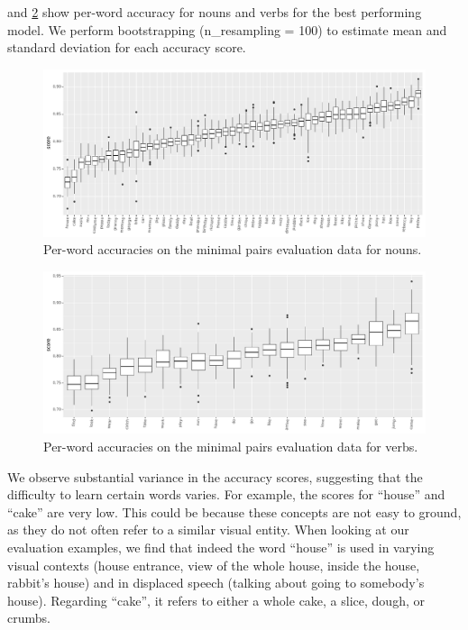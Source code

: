  and
\ref{fig:accuracy_targeted_triplets_verbs} show per-word
accuracy for nouns and verbs for the best performing model.
We perform bootstrapping (n\_resampling = 100) to estimate mean and standard 
deviation for each accuracy score.


\begin{figure}[htb]
  \centering
  \includegraphics[width=\textwidth]{results/targeted_triplets/results_per_word_version_335_NOUN.pdf}
  \caption{Per-word accuracies on the minimal pairs evaluation data for nouns.}
  \label{fig:accuracy_targeted_triplets_nouns}
\end{figure}

\begin{figure}[htb]
  \centering
  \includegraphics[width=\textwidth]{results/targeted_triplets/results_per_word_version_335_VERB.pdf}
  \caption{Per-word accuracies on the minimal pairs evaluation data
    for verbs.}
  \label{fig:accuracy_targeted_triplets_verbs}
\end{figure}

We observe substantial variance in the accuracy scores, suggesting that the 
difficulty to learn certain words varies. For example, the 
scores for ``house'' and ``cake'' are very low. This could be because these 
concepts are not easy to ground, as they do not often refer to a similar visual 
entity. When looking at our evaluation examples, we find that indeed the word 
``house'' is used in varying visual contexts (house entrance, view of the whole 
house, inside the house, rabbit's house) and in displaced speech (talking about 
going to somebody's house). Regarding ``cake'', it refers to either a whole 
cake, a slice, dough, or crumbs.

